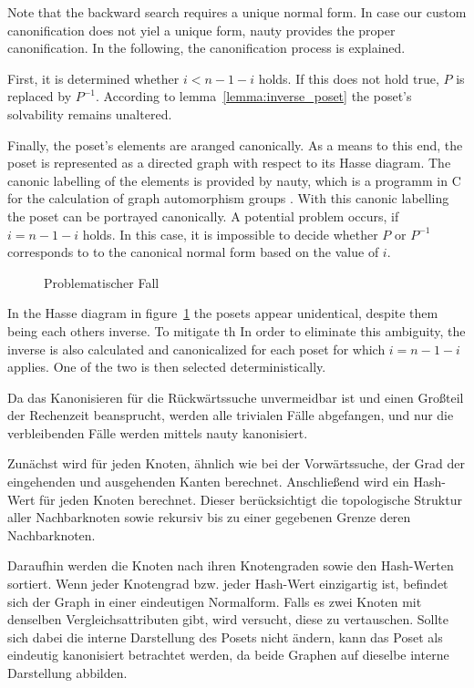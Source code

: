 \documentclass[10pt,journal,compsoc]{IEEEtran}
\begin{document}
Note that the backward search requires a unique normal form. In case our custom canonification does not yiel a unique form, nauty provides the proper canonification.
In the following, the canonification process is explained.

First, it is determined whether $i < n-1-i$ holds.
If this does not hold true, $P$ is replaced by $P^{-1}$.
According to lemma~\ref{lemma:inverse_poset} the poset's solvability remains unaltered.

Finally, the poset's elements are aranged canonically. 
As a means to this end, the poset is represented as a directed graph with respect to its Hasse diagram.
The canonic labelling of the elements is provided by nauty, which is a programm in C for the calculation of graph automorphism groups \cite{MCKAY201494}.
With this canonic labelling the poset can be portrayed canonically.
A potential problem occurs, if $i = n - 1 - i$ holds.
In this case, it is impossible to decide whether $P$ or $P^{-1}$ corresponds to
to the canonical normal form based on the value of $i$.

\begin{figure}
  
  \centering
  \caption{Problematischer Fall}
  \label{fig:backward_canonify_problematic}
\end{figure}

In the Hasse diagram in figure~\ref{fig:backward_canonify_problematic} the posets appear unidentical, despite them being each others inverse.
To mitigate th
In order to eliminate this ambiguity, the inverse is also calculated and canonicalized for each poset for which $i = n - 1 - i$ applies.
One of the two is then selected deterministically.

Da das Kanonisieren für die Rückwärtssuche unvermeidbar ist und einen Großteil der Rechenzeit beansprucht, werden alle trivialen Fälle abgefangen, und nur die verbleibenden Fälle werden mittels nauty kanonisiert.

Zunächst wird für jeden Knoten, ähnlich wie bei der Vorwärtssuche, der Grad der eingehenden und ausgehenden Kanten berechnet.
Anschließend wird ein Hash-Wert für jeden Knoten berechnet.
Dieser berücksichtigt die topologische Struktur aller Nachbarknoten sowie rekursiv bis zu einer gegebenen Grenze deren Nachbarknoten.

Daraufhin werden die Knoten nach ihren Knotengraden sowie den Hash-Werten sortiert.
Wenn jeder Knotengrad bzw. jeder Hash-Wert einzigartig ist, befindet sich der Graph in einer eindeutigen Normalform.
Falls es zwei Knoten mit denselben Vergleichsattributen gibt, wird versucht, diese zu vertauschen.
Sollte sich dabei die interne Darstellung des Posets nicht ändern, kann das Poset als eindeutig kanonisiert betrachtet werden, da beide Graphen auf dieselbe interne Darstellung abbilden.
\end{document}
